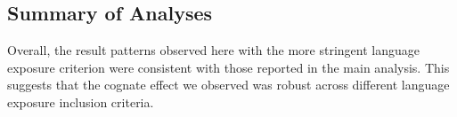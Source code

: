 \documentclass[
  ,man,floatsintext]{apa6}
\begin{document}
\hypertarget{summary-of-analyses}{%
\subsection{Summary of Analyses}\label{summary-of-analyses}}

Overall, the result patterns observed here with the more stringent language exposure criterion were consistent with those reported in the main analysis. This suggests that the cognate effect we observed was robust across different language exposure inclusion criteria.
\end{document}

